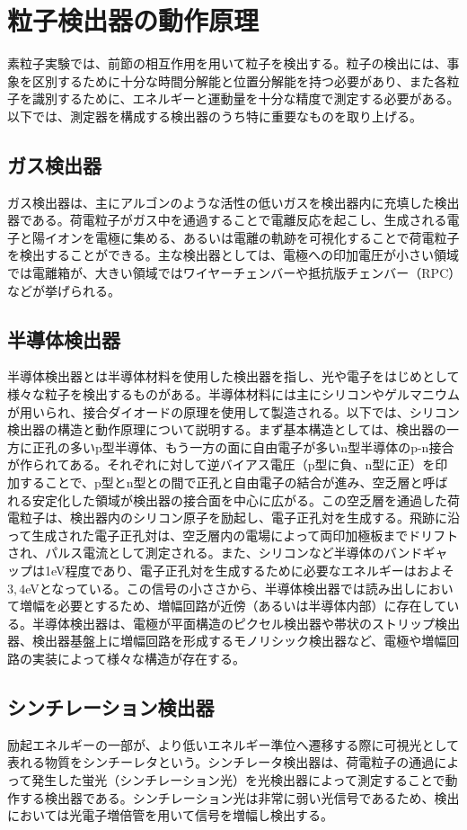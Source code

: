 \section{粒子検出器の動作原理}
 素粒子実験では、前節の相互作用を用いて粒子を検出する。粒子の検出には、事象を区別するために十分な時間分解能と位置分解能を持つ必要があり、また各粒子を識別するために、エネルギーと運動量を十分な精度で測定する必要がある。以下では、測定器を構成する検出器のうち特に重要なものを取り上げる。
\subsection{ガス検出器}
 ガス検出器は、主にアルゴンのような活性の低いガスを検出器内に充填した検出器である。荷電粒子がガス中を通過することで電離反応を起こし、生成される電子と陽イオンを電極に集める、あるいは電離の軌跡を可視化することで荷電粒子を検出することができる。主な検出器としては、電極への印加電圧が小さい領域では電離箱が、大きい領域ではワイヤーチェンバーや抵抗版チェンバー（RPC）などが挙げられる。
\subsection{半導体検出器}
 半導体検出器とは半導体材料を使用した検出器を指し、光や電子をはじめとして様々な粒子を検出するものがある。半導体材料には主にシリコンやゲルマニウムが用いられ、接合ダイオードの原理を使用して製造される。以下では、シリコン検出器の構造と動作原理について説明する。まず基本構造としては、検出器の一方に正孔の多いp型半導体、もう一方の面に自由電子が多いn型半導体のp-n接合が作られてある。それぞれに対して逆バイアス電圧（p型に負、n型に正）を印加することで、p型とn型との間で正孔と自由電子の結合が進み、空乏層と呼ばれる安定化した領域が検出器の接合面を中心に広がる。この空乏層を通過した荷電粒子は、検出器内のシリコン原子を励起し、電子正孔対を生成する。飛跡に沿って生成された電子正孔対は、空乏層内の電場によって両印加極板までドリフトされ、パルス電流として測定される。また、シリコンなど半導体のバンドギャップは1eV程度であり、電子正孔対を生成するために必要なエネルギーはおよそ$3,4$eVとなっている。この信号の小ささから、半導体検出器では読み出しにおいて増幅を必要とするため、増幅回路が近傍（あるいは半導体内部）に存在している。半導体検出器は、電極が平面構造のピクセル検出器や帯状のストリップ検出器、検出器基盤上に増幅回路を形成するモノリシック検出器など、電極や増幅回路の実装によって様々な構造が存在する。
\subsection{シンチレーション検出器}
 励起エネルギーの一部が、より低いエネルギー準位へ遷移する際に可視光として表れる物質をシンチーレタという。シンチレータ検出器は、荷電粒子の通過によって発生した蛍光（シンチレーション光）を光検出器によって測定することで動作する検出器である。シンチレーション光は非常に弱い光信号であるため、検出においては光電子増倍管を用いて信号を増幅し検出する。
 

